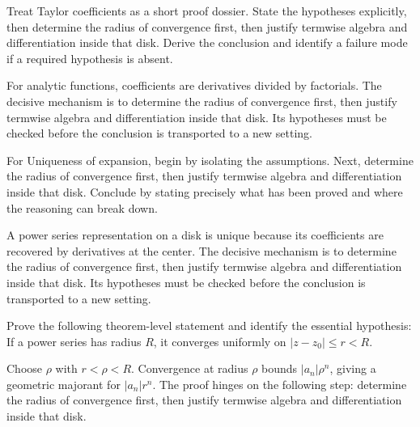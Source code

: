 \begin{problem}\label{prob:iv03-problem-07}
Treat Taylor coefficients as a short proof dossier. State the hypotheses explicitly, then determine the radius of convergence first, then justify termwise algebra and differentiation inside that disk. Derive the conclusion and identify a failure mode if a required hypothesis is absent.
\end{problem}
\begin{solution}
For analytic functions, coefficients are derivatives divided by factorials. The decisive mechanism is to determine the radius of convergence first, then justify termwise algebra and differentiation inside that disk. Its hypotheses must be checked before the conclusion is transported to a new setting.
\end{solution}

\begin{problem}\label{prob:iv03-problem-08}
For Uniqueness of expansion, begin by isolating the assumptions. Next, determine the radius of convergence first, then justify termwise algebra and differentiation inside that disk. Conclude by stating precisely what has been proved and where the reasoning can break down.
\end{problem}
\begin{solution}
A power series representation on a disk is unique because its coefficients are recovered by derivatives at the center. The decisive mechanism is to determine the radius of convergence first, then justify termwise algebra and differentiation inside that disk. Its hypotheses must be checked before the conclusion is transported to a new setting.
\end{solution}

\begin{problem}\label{prob:iv03-problem-09}
Prove the following theorem-level statement and identify the essential hypothesis: If a power series has radius $R$, it converges uniformly on $|z-z_0|\le r<R$.
\end{problem}
\begin{solution}
Choose $\rho$ with $r<\rho<R$. Convergence at radius $\rho$ bounds $|a_n|\rho^n$, giving a geometric majorant for $|a_n|r^n$. The proof hinges on the following step: determine the radius of convergence first, then justify termwise algebra and differentiation inside that disk.
\end{solution}

